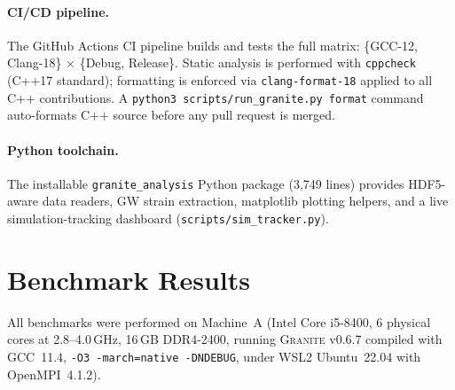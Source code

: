 \documentclass[aps,prd,twocolumn,superscriptaddress,nofootinbib,showpacs,
               longbibliography]{revtex4-2}
\newcommand{\granite}{\textsc{Granite}}
\newcommand{\code}[1]{\texttt{#1}}
\begin{document}
\paragraph{CI/CD pipeline.}
The GitHub Actions CI pipeline builds and tests the full matrix:
\{GCC-12, Clang-18\} $\times$ \{Debug, Release\}.
Static analysis is performed with \code{cppcheck} (C++17 standard);
formatting is enforced via \code{clang-format-18} applied to all C++
contributions.
A \code{python3 scripts/run\_granite.py format} command
auto-formats C++ source before any pull request is merged.

\paragraph{Python toolchain.}
The installable \code{granite\_analysis} Python package (3{,}749 lines)
provides HDF5-aware data readers, GW strain extraction, matplotlib
plotting helpers, and a live simulation-tracking dashboard
(\code{scripts/sim\_tracker.py}).

\section{Benchmark Results}
\label{sec:benchmarks}

All benchmarks were performed on Machine~A (Intel Core i5-8400, 6 physical
cores at 2.8--4.0\,GHz, 16\,GB DDR4-2400, running \granite{} v0.6.7 compiled
with GCC~11.4, \code{-O3 -march=native -DNDEBUG}, under WSL2 Ubuntu~22.04
with OpenMPI~4.1.2).
\end{document}
